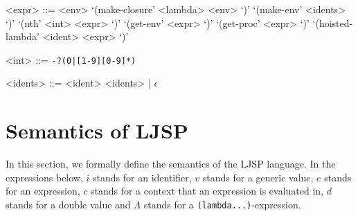 \documentclass[11pt]{report}
\begin{document}
\begin{grammar}
<expr> ::= <env>
\alt `(make-closure' <lambda> <env> `)'
\alt `(make-env' <idents> `)'
\alt `(nth' <int> <expr> `)'
\alt `(get-env' <expr> `)'
\alt `(get-proc' <expr> `)'
\alt `(hoisted-lambda' <ident> <expr> `)'

<int> ::= \texttt{-?(0|[1-9][0-9]*)}

<idents> ::= <ident> <idents> | $\epsilon$
\end{grammar}


\section{Semantics of LJSP}
In this section, we formally define the semantics of the LJSP language. In the expressions below, $i$ stands for an identifier, $v$ stands for a generic value, $e$ stands for an expression, $c$ stands for a context that an expression is evaluated in, $d$ stands for a double value and $\Lambda$ stands for a \texttt{(lambda...)}-expression.

\end{document}
